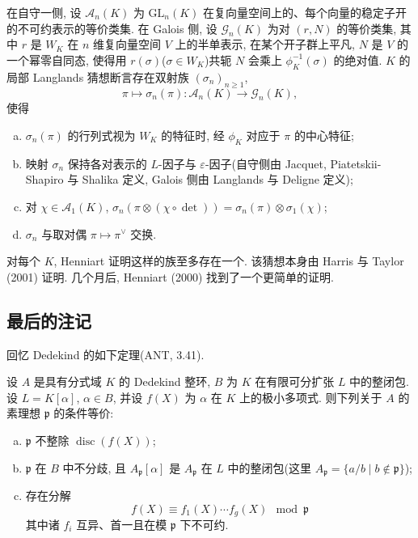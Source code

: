 在自守一侧, 设 $\mathcal{A}_{n}(K)$ 为 $\mathrm{GL}_{n}(K)$ 在复向量空间上的、每个向量的稳定子开的不可约表示的等价类集. 在 Galois 侧, 设 $\mathcal{G}_{n}(K)$ 为对 $(r, N)$ 的等价类集, 其中 $r$ 是 $W_{K}$ 在 $n$ 维复向量空间 $V$ 上的半单表示, 在某个开子群上平凡, $N$ 是 $V$ 的一个幂零自同态, 使得用 $r(\sigma)$($\sigma \in W_{K}$)共轭 $N$ 会乘上 $\phi_{K}^{-1}(\sigma)$ 的绝对值. $K$ 的局部 Langlands 猜想断言存在双射族 $(\sigma_{n})_{n \geq 1}$,
\[
\pi \mapsto \sigma_{n}(\pi) \colon \mathcal{A}_{n}(K) \to \mathcal{G}_{n}(K),
\]
使得
\begin{enumerate}[(a)]
\item $\sigma_{n}(\pi)$ 的行列式视为 $W_{K}$ 的特征时, 经 $\phi_{K}$ 对应于 $\pi$ 的中心特征;
\item 映射 $\sigma_{n}$ 保持各对表示的 $L$-因子与 $\varepsilon$-因子(自守侧由 Jacquet, Piatetskii-Shapiro 与 Shalika 定义, Galois 侧由 Langlands 与 Deligne 定义);
\item 对 $\chi \in \mathcal{A}_{1}(K)$, $\sigma_{n}(\pi \otimes (\chi \circ \det)) = \sigma_{n}(\pi) \otimes \sigma_{1}(\chi)$;
\item $\sigma_{n}$ 与取对偶 $\pi \mapsto \pi^{\vee}$ 交换.
\end{enumerate}
对每个 $K$, Henniart 证明这样的族至多存在一个. 该猜想本身由 Harris 与 Taylor (2001)\cite{HarrisTaylor2001} 证明. 几个月后, Henniart (2000)\cite{Henniart2000} 找到了一个更简单的证明.

\subsection*{最后的注记}

回忆 Dedekind 的如下定理(ANT, 3.41).

\begin{theorem}\label{thm:0.10}
设 $A$ 是具有分式域 $K$ 的 Dedekind 整环, $B$ 为 $K$ 在有限可分扩张 $L$ 中的整闭包. 设 $L = K[\alpha]$, $\alpha \in B$, 并设 $f(X)$ 为 $\alpha$ 在 $K$ 上的极小多项式. 则下列关于 $A$ 的素理想 $\mathfrak{p}$ 的条件等价:
\begin{enumerate}[(a)]
\item $\mathfrak{p}$ 不整除 $\operatorname{disc}(f(X))$;
\item $\mathfrak{p}$ 在 $B$ 中不分歧, 且 $A_{\mathfrak{p}}[\alpha]$ 是 $A_{\mathfrak{p}}$ 在 $L$ 中的整闭包(这里 $A_{\mathfrak{p}} = \{a/b \mid b \notin \mathfrak{p}\}$);
\item 存在分解
\[
f(X) \equiv f_{1}(X) \cdots f_{g}(X) \mod \mathfrak{p}
\]
其中诸 $f_{i}$ 互异、首一且在模 $\mathfrak{p}$ 下不可约.
\end{enumerate}
\end{theorem}

